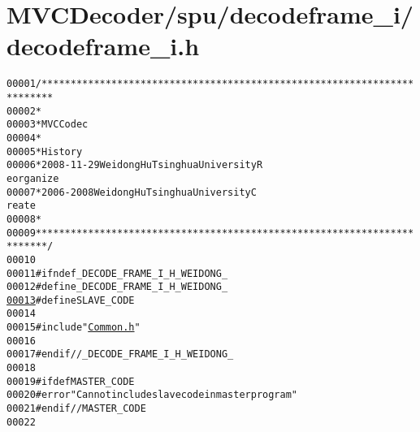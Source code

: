 \hypertarget{decodeframe__i_8h_source}{
\section{MVCDecoder/spu/decodeframe\_\-i/decodeframe\_\-i.h}
}


\begin{footnotesize}\begin{alltt}
00001 \textcolor{comment}{/************************************************************************}
00002 \textcolor{comment}{ *}
00003 \textcolor{comment}{ * MVC Codec}
00004 \textcolor{comment}{ * }
00005 \textcolor{comment}{ * History}
00006 \textcolor{comment}{ * 2008-11-29           Weidong Hu              Tsinghua University             R
      eorganize}
00007 \textcolor{comment}{ * 2006-2008            Weidong Hu              Tsinghua University             C
      reate}
00008 \textcolor{comment}{ * }
00009 \textcolor{comment}{ ************************************************************************/}
00010 
00011 \textcolor{preprocessor}{#ifndef \_DECODE\_FRAME\_I\_H\_WEIDONG\_}
00012 \textcolor{preprocessor}{}\textcolor{preprocessor}{#define \_DECODE\_FRAME\_I\_H\_WEIDONG\_}
\hypertarget{decodeframe__i_8h_source_l00013}{}\hyperlink{decodeframe__i_8h_a995f6a4907273b8d56b6543ab1a57d17}{00013} \textcolor{preprocessor}{}\textcolor{preprocessor}{#define SLAVE\_CODE}
00014 \textcolor{preprocessor}{}
00015 \textcolor{preprocessor}{#include "\hyperlink{_common_8h}{Common.h}"}
00016 
00017 \textcolor{preprocessor}{#endif //\_DECODE\_FRAME\_I\_H\_WEIDONG\_}
00018 \textcolor{preprocessor}{}
00019 \textcolor{preprocessor}{#ifdef MASTER\_CODE}
00020 \textcolor{preprocessor}{}\textcolor{preprocessor}{#error "Can not include slave code in master program"}
00021 \textcolor{preprocessor}{}\textcolor{preprocessor}{#endif // MASTER\_CODE}
00022 \textcolor{preprocessor}{}
\end{alltt}\end{footnotesize}
